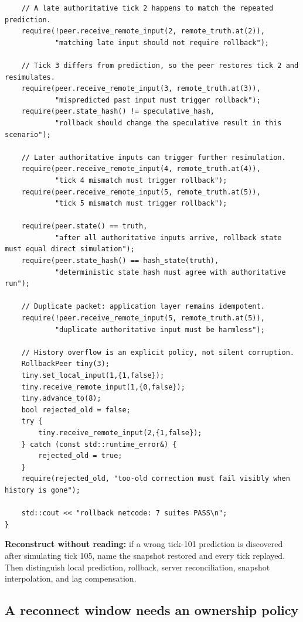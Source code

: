 \begin{verbatim}
    // A late authoritative tick 2 happens to match the repeated prediction.
    require(!peer.receive_remote_input(2, remote_truth.at(2)),
            "matching late input should not require rollback");

    // Tick 3 differs from prediction, so the peer restores tick 2 and resimulates.
    require(peer.receive_remote_input(3, remote_truth.at(3)),
            "mispredicted past input must trigger rollback");
    require(peer.state_hash() != speculative_hash,
            "rollback should change the speculative result in this scenario");

    // Later authoritative inputs can trigger further resimulation.
    require(peer.receive_remote_input(4, remote_truth.at(4)),
            "tick 4 mismatch must trigger rollback");
    require(peer.receive_remote_input(5, remote_truth.at(5)),
            "tick 5 mismatch must trigger rollback");

    require(peer.state() == truth,
            "after all authoritative inputs arrive, rollback state must equal direct simulation");
    require(peer.state_hash() == hash_state(truth),
            "deterministic state hash must agree with authoritative run");

    // Duplicate packet: application layer remains idempotent.
    require(!peer.receive_remote_input(5, remote_truth.at(5)),
            "duplicate authoritative input must be harmless");

    // History overflow is an explicit policy, not silent corruption.
    RollbackPeer tiny(3);
    tiny.set_local_input(1,{1,false});
    tiny.receive_remote_input(1,{0,false});
    tiny.advance_to(8);
    bool rejected_old = false;
    try {
        tiny.receive_remote_input(2,{1,false});
    } catch (const std::runtime_error&) {
        rejected_old = true;
    }
    require(rejected_old, "too-old correction must fail visibly when history is gone");

    std::cout << "rollback netcode: 7 suites PASS\n";
}
\end{verbatim}

\textbf{Reconstruct without reading:} if a wrong tick-101 prediction is discovered after simulating tick 105, name the snapshot restored and every tick replayed. Then distinguish local prediction, rollback, server reconciliation, snapshot interpolation, and lag compensation.

\subsection{A reconnect window needs an ownership policy}\label{06-engine-ii-ch047-a-reconnect-window-needs-an-ownership-policy}

